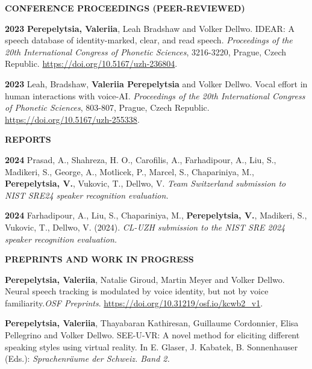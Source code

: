 \documentclass[11pt]{article}
\newcommand{\hangpara}{
 \setlength{\parindent}{0in} %
 \hangindent=0.42in %
}
\begin{document}
\vskip 18pt
\begin{flushleft}
{\bf CONFERENCE PROCEEDINGS (PEER-REVIEWED)}
\end{flushleft}
\vskip 6pt
\hangpara
{\bf 2023}\hspace{1ex} \textbf{Perepelytsia, Valeriia}, Leah Bradshaw and Volker Dellwo. IDEAR: A speech database of identity-marked, clear, and read speech. \textit{Proceedings of the 20th International Congress of Phonetic Sciences}, 3216-3220, Prague, Czech Republic. \url{https://doi.org/10.5167/uzh-236804}.
\vskip 6pt
\hangpara
{\bf 2023}\hspace{1ex} Leah, Bradshaw, \textbf{Valeriia Perepelytsia} and Volker Dellwo. Vocal effort in human interactions with voice-AI. \textit{Proceedings of the 20th International Congress of Phonetic Sciences}, 803-807, Prague, Czech Republic. \url{https://doi.org/10.5167/uzh-255338}.



\vskip 18pt
\begin{flushleft}
{\bf REPORTS}
\end{flushleft}
\vskip 6pt
\hangpara
{\bf 2024}\hspace{1ex} Prasad, A., Shahreza, H. O., Carofilis, A., Farhadipour, A., Liu, S., Madikeri, S., George, A., Motlicek, P., Marcel, S., Chapariniya, M., \textbf{Perepelytsia, V.}, Vukovic, T., Dellwo, V. \textit{Team Switzerland submission to NIST SRE24 speaker recognition evaluation.}
\vskip 6pt
\hangpara
{\bf 2024}\hspace{1ex} Farhadipour, A., Liu, S., Chapariniya, M., \textbf{Perepelytsia, V.}, Madikeri, S., Vukovic, T., Dellwo, V. (2024). \textit{CL-UZH submission to the NIST SRE 2024 speaker recognition evaluation.}



\vskip 20pt
\begin{flushleft}
{\bf PREPRINTS AND WORK IN PROGRESS}
\end{flushleft}
\vskip 6pt
\hangpara
\textbf{Perepelytsia, Valeriia}, Natalie Giroud, Martin Meyer and Volker Dellwo. Neural speech tracking is modulated by voice identity, but not by voice familiarity.{\it OSF Preprints}. \url{https://doi.org/10.31219/osf.io/kcwb2_v1}.
\vskip 6pt
\hangpara
\textbf{Perepelytsia, Valeriia}, Thayabaran Kathiresan, Guillaume Cordonnier, Elisa Pellegrino and Volker Dellwo. SEE-U-VR: A novel method for eliciting different speaking styles  using virtual reality. In E. Glaser, J. Kabatek, B. Sonnenhauser (Eds.): \textit{Sprachenräume der Schweiz. Band 2.}
\end{document}
